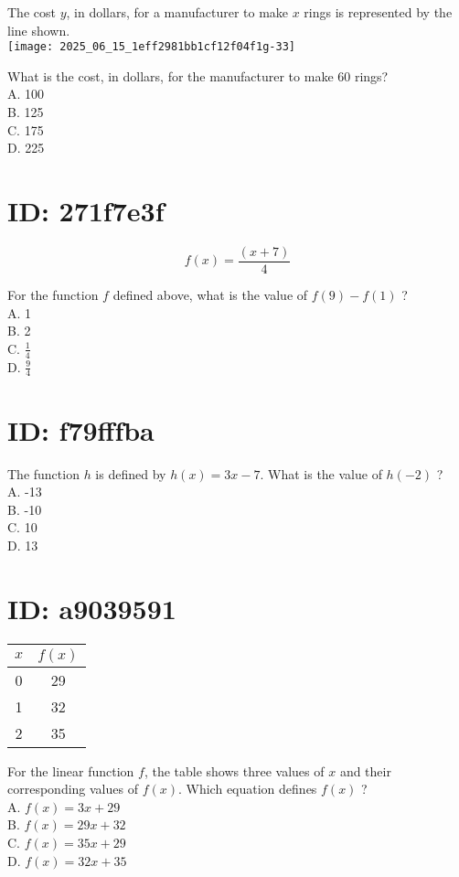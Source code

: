 The cost $y$, in dollars, for a manufacturer to make $x$ rings is represented by the line shown.\\
\texttt{[image: 2025\_06\_15\_1eff2981bb1cf12f04f1g-33]}

What is the cost, in dollars, for the manufacturer to make 60 rings?\\
A. 100\\
B. 125\\
C. 175\\
D. 225

\section*{ID: 271f7e3f}
$$
f(x)=\frac{(x+7)}{4}
$$

For the function $f$ defined above, what is the value of $f(9)-f(1)$ ?\\
A. 1\\
B. 2\\
C. $\frac{1}{4}$\\
D. $\frac{9}{4}$

\section*{ID: f79fffba}
The function $h$ is defined by $h(x)=3 x-7$. What is the value of $h(-2)$ ?\\
A. -13\\
B. -10\\
C. 10\\
D. 13

\section*{ID: a9039591}
\begin{center}
\begin{tabular}{|c|c|}
\hline
$x$ & $f(x)$ \\
\hline
0 & 29 \\
\hline
1 & 32 \\
\hline
2 & 35 \\
\hline
\end{tabular}
\end{center}

For the linear function $f$, the table shows three values of $x$ and their corresponding values of $f(x)$. Which equation defines $f(x)$ ?\\
A. $f(x)=3 x+29$\\
B. $f(x)=29 x+32$\\
C. $f(x)=35 x+29$\\
D. $f(x)=32 x+35$

